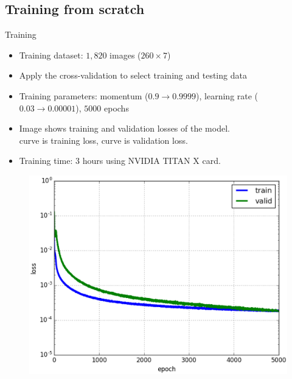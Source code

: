 \documentclass[10pt,svgnames]{beamer}
\begin{document}
\subsection{Training from scratch}
\begin{frame}{Training}{}
	\begin{itemize}
		\item Training dataset: \textbf{$1,820$} images ($260 \times 7$)
		\item Apply the cross-validation to select training and testing data
		\item Training parameters: momentum ($0.9 \rightarrow 0.9999$), learning rate ($0.03 \rightarrow 0.00001$), $5000$ epochs\footnotemark
		\item Image shows training and validation losses of the model.\\ \small{\color{blue}{Blue} curve is training loss, \color{green}{green} curve is validation loss.}
		\item Training time: 3 hours using NVIDIA TITAN X card.
	\end{itemize}
	\begin{center}
     \begin{figure}[htbp]
        \centering
        \includegraphics[scale=.30]{images/loss_model_3}
    	\label{figrsexample1}
	\end{figure}
  \end{center}
	
\end{frame}
\end{document}
